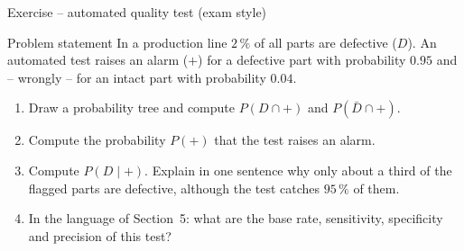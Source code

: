 \documentclass[aspectratio=169,11pt]{beamer}
\begin{document}
\begin{frame}{Exercise -- automated quality test (exam style)}
  \begin{block}{Problem statement}
    In a production line $2\,\%$ of all parts are defective ($D$). An
    automated test raises an alarm ($+$) for a defective part with
    probability $0.95$ and -- wrongly -- for an intact part with probability
    $0.04$.
    \begin{enumerate}
      \item Draw a probability tree and compute $P(D\cap +)$ and
            $P(\bar D\cap +)$.
      \item Compute the probability $P(+)$ that the test raises an alarm.
      \item Compute $P(D\mid +)$. Explain in one sentence why only about a
            third of the flagged parts are defective, although the test
            catches $95\,\%$ of them.
      \item In the language of Section~5: what are the base rate,
            sensitivity, specificity and precision of this test?
    \end{enumerate}
  \end{block}
\end{frame}
\end{document}
